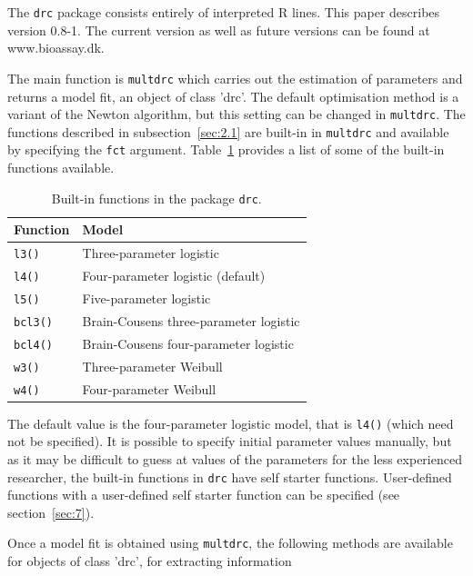 \documentclass[a4paper]{article}
\begin{document}
The \verb+drc+ package consists entirely of interpreted R lines. This paper describes version 0.8-1. The current version as well as future versions 
can be found at www.bioassay.dk.

The main function is \verb+multdrc+ which carries out the estimation of parameters and returns a model fit, an object of class 'drc'. The default 
optimisation method is a variant of the Newton algorithm, but this setting can be changed in \verb+multdrc+. The functions 
described in subsection~\ref{sec:2.1} are built-in in \verb+multdrc+ and available by specifying the \verb+fct+ argument. 
Table~\ref{sec3-table1} provides a list of some of the built-in functions available.

\begin{table}[!htbp]
\begin{center}
\begin{tabular}{|l|l|}
\hline
Function & Model\\
\hline
\verb+l3()+ & Three-parameter logistic\\
\verb+l4()+ & Four-parameter logistic (default)\\
\verb+l5()+ & Five-parameter logistic\\
\verb+bcl3()+ & Brain-Cousens three-parameter logistic\\
\verb+bcl4()+ & Brain-Cousens four-parameter logistic\\
\verb+w3()+ & Three-parameter Weibull\\
\verb+w4()+ & Four-parameter Weibull\\
\hline
\end{tabular} \caption{Built-in functions in the package \texttt{drc}.} \label{sec3-table1}
\end{center} 
\end{table}

\noindent The default value is the four-parameter logistic model, that is \verb+l4()+ (which need not be specified). 
It is possible to specify initial parameter values manually, but as it may be difficult to guess at values of the parameters 
for the less experienced researcher, the built-in functions in \verb+drc+ have self starter functions. 
User-defined functions with a user-defined self starter function can be specified (see section~\ref{sec:7}). 

Once a model fit is obtained using \verb+multdrc+, the following methods are available for objects of class 'drc', for extracting information
\end{document}
